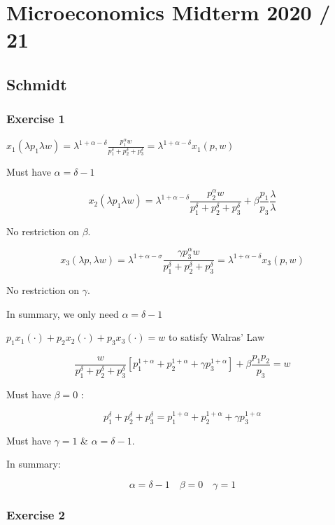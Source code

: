 \section{Microeconomics Midterm 2020 / 21}

{
\subsection*{Schmidt}

{
\subsubsection*{Exercise 1}

\begin{enumerate}[label=(\alph*)]
{\item 
$x_{1}\left(\lambda p_{1} \lambda w\right)=\lambda^{1+\alpha-\delta} \frac{p_{1}^{\alpha} w}{p_{1}^{\delta}+p_{2}^{\delta}+p_{3}^{\delta}}=\lambda^{1+\alpha-\delta} x_{1}(p, w)$

Must have $\alpha=\delta-1$

$$
x_{2}\left(\lambda p_{1} \lambda w\right)=\lambda^{1+\alpha-\delta} \frac{p_{2}^{\alpha} w}{p_{1}^{\delta}+p_{2}^{\delta}+p_{3}^{\delta}}+\beta \frac{p_{1}}{p_{3}} \frac{\lambda}{\lambda}
$$

No restriction on $\beta$.

$$
x_{3}(\lambda p, \lambda w)=\lambda^{1+\alpha-\sigma} \frac{\gamma p_{3}^{\alpha} w}{p_{1}^{\delta}+p_{2}^{\delta}+p_{3}^{\delta}}=\lambda^{1+\alpha-\delta} x_{3}(p, w)
$$

No restriction on $\gamma$.

In summary, we only need $\alpha=\delta-1$
}
{\item 
$p_{1} x_{1}(\cdot)+p_{2} x_{2}(\cdot)+p_{3} x_{3}(\cdot)=w$ to satisfy Walras' Law

$$
\frac{w}{p_{1}^{\delta}+p_{2}^{\delta}+p_{3}^{\delta}}\left[p_{1}^{1+\alpha}+p_{2}^{1+\alpha}+\gamma p_{3}^{1+\alpha}\right]+\beta \frac{p_{1} p_{2}}{p_{3}}=w
$$

Must have $\beta=0$ :

$$
p_{1}^{\delta}+p_{2}^{\delta}+p_{3}^{\delta}=p_{1}^{1+\alpha}+p_{2}^{1+\alpha}+\gamma p_{3}^{1+\alpha}
$$

Must have $\gamma=1$ \& $\alpha=\delta-1$.

In summary:

$$
\alpha=\delta-1 \quad \beta=0 \quad \gamma=1
$$
}
\end{enumerate}
}
{
\subsubsection*{Exercise 2}

}}
